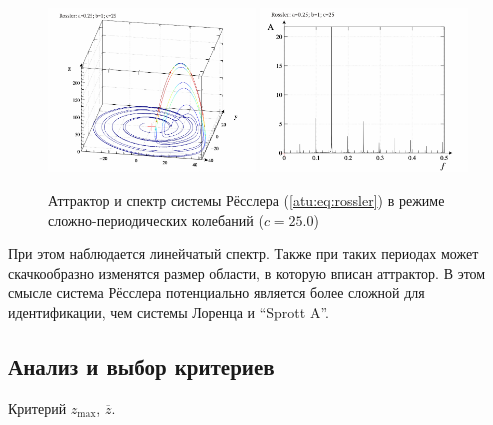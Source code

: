 \begin{figure}[ht!]
\begin{center}
  \includegraphics[width=0.49\textwidth]{p/cha/ross/ross0-p_xyz_c=25x00.png}
  \hfill
  \includegraphics[width=0.49\textwidth]{p/cha/ross/ross_f-p_f_c=25x00.png}
\end{center}
  \caption{Аттрактор и спектр системы Рёсслера (\ref{atu:eq:rossler}) в режиме сложно-периодических колебаний ($c=25.0$)}
\label{atu:f:ross_attractor_2500}
\end{figure}

При этом наблюдается линейчатый спектр. Также при
таких периодах может скачкообразно изменятся
размер области, в которую вписан аттрактор.
В этом смысле система Рёсслера потенциально является более сложной
для идентификации, чем системы Лоренца и ``Sprott A''.

%



\subsection{Анализ и выбор критериев}  %

Критерий
$ z_{\max}$, $ \overline{z} $.


